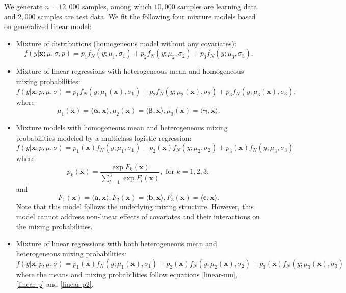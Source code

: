 \documentclass[11pt]{article}
\numberwithin{equation}{section}
\def\bx{\boldsymbol{x}}
\begin{document}
We generate $n=12,000$ samples, among which $10,000$ samples are learning data and $2,000$ samples are test data.
We fit the following four mixture models based on generalized linear model:
\begin{itemize}
	\item 	Mixture of distributions (homogeneous model without any covariates):
	\begin{equation}\label{gaussian-0}
		f(y|\bx;\mu,\sigma,p)=p_1f_N(y;\mu_1,\sigma_1)+p_2f_N(y;\mu_2,\sigma_2)+p_3f_N(y;\mu_3,\sigma_3).
	\end{equation}

	\item 	Mixture of linear regressions with heterogeneous mean and homogeneous mixing probabilities:
\begin{equation}\label{gaussian-glm-mu}
	f(y|\bx;p,\mu,\sigma)=p_1f_N(y;\mu_1(\bx),\sigma_1)+p_2f_N(y;\mu_2(\bx),\sigma_2)+p_3f_N(y;\mu_3(\bx),\sigma_3),
\end{equation}
where
\begin{equation}\label{linear-mu}
	\mu_1(\bx)=\langle\boldsymbol{\alpha},\bx\rangle, \mu_2(\bx)=\langle\boldsymbol{\beta},\bx\rangle,\mu_3(\bx)=\langle\boldsymbol{\gamma},\bx\rangle.
\end{equation}

\item 	Mixture models with homogeneous mean and heterogeneous mixing probabilities modeled by a multiclass logistic regression:
\begin{equation}\label{gaussian-glm-p}
	f(y|\bx;p,\mu,\sigma)=p_1(\bx)f_N(y;\mu_1,\sigma_1)+p_2(\bx)f_N(y;\mu_2,\sigma_2)+p_3(\bx)f_N(y;\mu_3,\sigma_3)
\end{equation}
where
\begin{equation}\label{linear-p}
	p_k(\bx)=\frac{\exp{F_k(\bx)}}{\sum_{l=1}^{3}\exp{F_l(\bx)}}, \text{ for } k=1,2,3,
\end{equation}
and 
\begin{equation}\label{linear-p2}
	F_1(\bx)=\langle \boldsymbol{a},\bx\rangle, F_2(\bx)=\langle \boldsymbol{b},\bx\rangle,F_3(\bx)=\langle \boldsymbol{c},\bx\rangle.
\end{equation}
Note that this model follows the underlying mixing structure. However, this model cannot address non-linear effects of covariates and their interactions on the mixing probabilities.

	\item 	Mixture of linear regressions with both heterogeneous mean and heterogeneous mixing probabilities:
	\begin{equation}\label{gaussian-glm-b}
		f(y|\bx;p,\mu,\sigma)=p_1(\bx)f_N(y;\mu_1(\bx),\sigma_1)+p_2(\bx)f_N(y;\mu_2(\bx),\sigma_2)+p_3(\bx)f_N(y;\mu_3(\bx),\sigma_3)
	\end{equation}
where the means and mixing probabilities follow equations \eqref{linear-mu}, \eqref{linear-p} and \eqref{linear-p2}.
\end{itemize}
\end{document}
